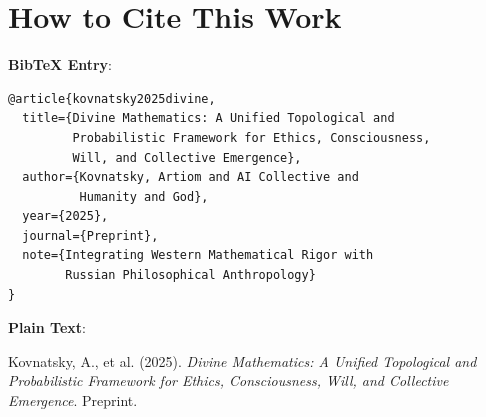 \documentclass[11pt,a4paper]{article}
\theoremstyle{definition}
\theoremstyle{remark}
\begin{document}
\section{How to Cite This Work}

\textbf{BibTeX Entry}:
\begin{verbatim}
@article{kovnatsky2025divine,
  title={Divine Mathematics: A Unified Topological and 
         Probabilistic Framework for Ethics, Consciousness, 
         Will, and Collective Emergence},
  author={Kovnatsky, Artiom and AI Collective and 
          Humanity and God},
  year={2025},
  journal={Preprint},
  note={Integrating Western Mathematical Rigor with 
        Russian Philosophical Anthropology}
}
\end{verbatim}

\textbf{Plain Text}:

Kovnatsky, A., et al. (2025). \textit{Divine Mathematics: A Unified Topological and Probabilistic Framework for Ethics, Consciousness, Will, and Collective Emergence}. Preprint.
\end{document}
